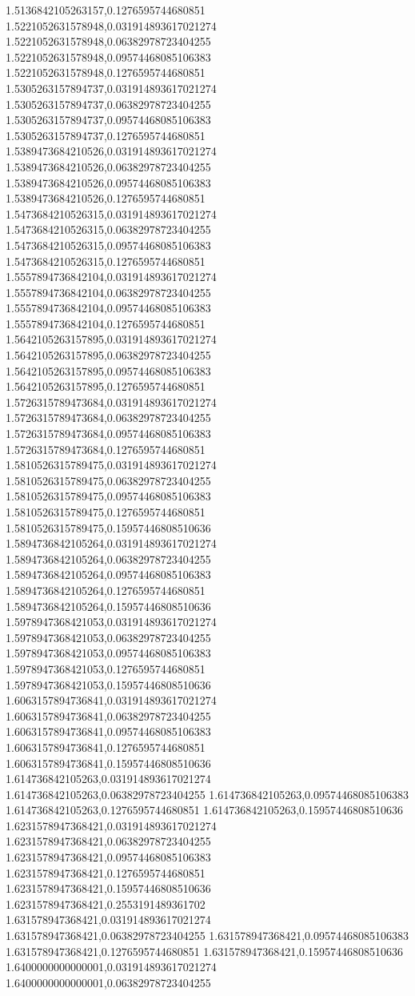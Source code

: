 1.5136842105263157,0.1276595744680851
1.5221052631578948,0.031914893617021274
1.5221052631578948,0.06382978723404255
1.5221052631578948,0.09574468085106383
1.5221052631578948,0.1276595744680851
1.5305263157894737,0.031914893617021274
1.5305263157894737,0.06382978723404255
1.5305263157894737,0.09574468085106383
1.5305263157894737,0.1276595744680851
1.5389473684210526,0.031914893617021274
1.5389473684210526,0.06382978723404255
1.5389473684210526,0.09574468085106383
1.5389473684210526,0.1276595744680851
1.5473684210526315,0.031914893617021274
1.5473684210526315,0.06382978723404255
1.5473684210526315,0.09574468085106383
1.5473684210526315,0.1276595744680851
1.5557894736842104,0.031914893617021274
1.5557894736842104,0.06382978723404255
1.5557894736842104,0.09574468085106383
1.5557894736842104,0.1276595744680851
1.5642105263157895,0.031914893617021274
1.5642105263157895,0.06382978723404255
1.5642105263157895,0.09574468085106383
1.5642105263157895,0.1276595744680851
1.5726315789473684,0.031914893617021274
1.5726315789473684,0.06382978723404255
1.5726315789473684,0.09574468085106383
1.5726315789473684,0.1276595744680851
1.5810526315789475,0.031914893617021274
1.5810526315789475,0.06382978723404255
1.5810526315789475,0.09574468085106383
1.5810526315789475,0.1276595744680851
1.5810526315789475,0.15957446808510636
1.5894736842105264,0.031914893617021274
1.5894736842105264,0.06382978723404255
1.5894736842105264,0.09574468085106383
1.5894736842105264,0.1276595744680851
1.5894736842105264,0.15957446808510636
1.5978947368421053,0.031914893617021274
1.5978947368421053,0.06382978723404255
1.5978947368421053,0.09574468085106383
1.5978947368421053,0.1276595744680851
1.5978947368421053,0.15957446808510636
1.6063157894736841,0.031914893617021274
1.6063157894736841,0.06382978723404255
1.6063157894736841,0.09574468085106383
1.6063157894736841,0.1276595744680851
1.6063157894736841,0.15957446808510636
1.614736842105263,0.031914893617021274
1.614736842105263,0.06382978723404255
1.614736842105263,0.09574468085106383
1.614736842105263,0.1276595744680851
1.614736842105263,0.15957446808510636
1.6231578947368421,0.031914893617021274
1.6231578947368421,0.06382978723404255
1.6231578947368421,0.09574468085106383
1.6231578947368421,0.1276595744680851
1.6231578947368421,0.15957446808510636
1.6231578947368421,0.2553191489361702
1.631578947368421,0.031914893617021274
1.631578947368421,0.06382978723404255
1.631578947368421,0.09574468085106383
1.631578947368421,0.1276595744680851
1.631578947368421,0.15957446808510636
1.6400000000000001,0.031914893617021274
1.6400000000000001,0.06382978723404255
